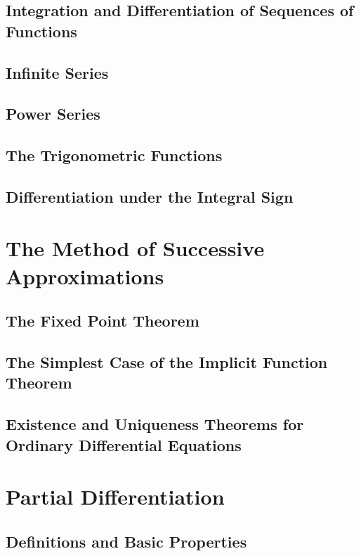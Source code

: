 \documentclass{article}
\theoremstyle{definition}
\theoremstyle{theorem}
\begin{document}
		\subsection{Integration and Differentiation of Sequences of Functions}
		
		\subsection{Infinite Series}
		
		\subsection{Power Series}
		
		\subsection{The Trigonometric Functions}
		
		\subsection{Differentiation under the Integral Sign}
		
		
	\section{The Method of Successive Approximations}
		\subsection{The Fixed Point Theorem}
		
		\subsection{The Simplest Case of the Implicit Function Theorem}
		
		\subsection{Existence and Uniqueness Theorems for Ordinary Differential Equations}
	
	
	\section{Partial Differentiation}
		\subsection{Definitions and Basic Properties}
		
\end{document}
